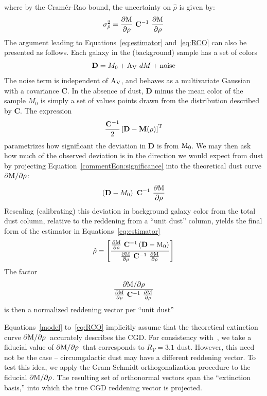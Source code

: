 \documentclass[11pt, oneside]{article}   	%
\newcommand{\dMdp}{\rm \frac{\partial M}{\partial \rho}}
\newcommand{\dMinline}{$\rm \partial M / \partial \rho$}
\begin{document}
where by the Cram\'{e}r-Rao bound, the uncertainty on $\hat{\rho}$ is given by:
\begin{equation}
\sigma^2_{\hat{\rho}} = \rm \dMdp\ \mathbf{C}^{-1 }\ \dMdp \label{eq:RCO}
\end{equation}
 The argument leading to Equations~\ref{eq:estimator} and~\ref{eq:RCO} can also be presented as follows. Each galaxy in the (background) sample has a set of colors
 \begin{equation}\label{commentEqn:model}
\mathbf{D} = M_0+ {\rm A_V}\ dM + \text{noise}
 \end{equation}
 The noise term is independent of $\rm A_V$, and behaves as a multivariate Gaussian with a covariance $\mathbf{C}$. In the absence of dust, $\mathbf{D}$ minus the mean color of the sample $M_0$ is simply a set of values points drawn from the distribution described by $\mathbf{C}$. The expression 
 \begin{equation}\label{commentEqn:significance}
 \frac{\mathbf{C}^{-1}}{2} \left[\mathbf{D} - \mathbf{M}(\rho)\right ]^{\rm T}
\end{equation} 
parametrizes how significant the deviation in $\mathbf{D}$ is from $\rm {M_0}$. We may then ask how much of the observed deviation is in the direction we would expect from dust by projecting Equation~\ref{commentEqn:significance} into the theoretical dust curve \dMinline:
  \begin{equation}
  \left (\mathbf{D} - M_0 \right )\ \mathbf{C}^{-1} \ \dMdp 
 \end{equation}
Rescaling (calibrating) this deviation in background galaxy color from the total dust column, relative to the reddening from a ``unit dust'' column, yields the final form of the estimator in Equations~\ref{eq:estimator}
\begin{equation}
\hat{\rho} = \rm \left[ \frac{ \dMdp \ \mathbf{C}^{-1} \left (\mathbf{D} - M_0 \right )} {\dMdp\ \mathbf{C}^{-1 }\ \dMdp} \right ]
\end{equation}
The factor
\begin{equation}
\frac{\rm \partial M / \partial \rho} {\dMdp\ \mathbf{C}^{-1 }\ \dMdp}
\end{equation}
is then a normalized reddening vector per ``unit dust''  
 
Equations~\ref{model} to~\ref{eq:RCO} implicitly assume that the theoretical extinction curve \dMinline~accurately describes the CGD. For consistency with~\cite{menard2010measure}, we take a fiducial value of \dMinline~that corresponds to $R_V = 3.1$ dust. However, this need not be the case -- circumgalactic dust may have a different reddening vector. To test this idea, we apply the Gram-Schmidt orthogonalization procedure to the fiducial \dMinline. The resulting set of orthonormal vectors span the ``extinction basis,'' into which the true CGD reddening vector is projected. 
\end{document}
